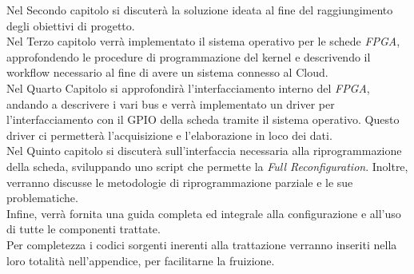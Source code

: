 Nel Secondo capitolo si discuterà la soluzione ideata al fine del raggiungimento degli obiettivi di progetto.\\
Nel Terzo capitolo verrà implementato il sistema operativo per le schede \textit{FPGA}, approfondendo le procedure di programmazione del kernel e descrivendo il workflow necessario al fine di avere un sistema connesso al Cloud.\\
Nel Quarto Capitolo si approfondirà l'interfacciamento interno del \textit{FPGA}, andando a descrivere i vari bus e verrà implementato un driver per l'interfacciamento con il GPIO della scheda tramite il sistema operativo. Questo driver ci permetterà l'acquisizione e l'elaborazione in loco dei dati.\\
Nel Quinto capitolo si discuterà sull'interfaccia necessaria alla riprogrammazione della scheda, sviluppando uno script che permette la \textit{Full Reconfiguration}. Inoltre, verranno discusse le metodologie di riprogrammazione parziale e le sue problematiche.\\
Infine, verrà fornita una guida completa ed integrale alla configurazione e all'uso di tutte le componenti trattate.\\
Per completezza i codici sorgenti inerenti alla trattazione verranno inseriti nella loro totalità nell'appendice, per facilitarne la fruizione.